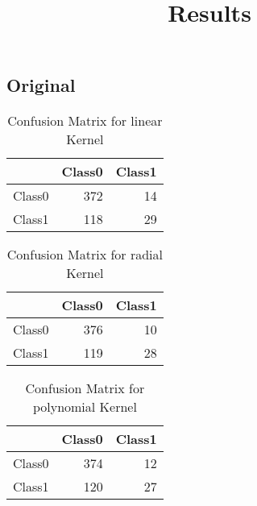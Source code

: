 

\title{Results}


\maketitle
	
\subsection{Original}

\begin{table}[H]
\centering
\begin{tabular}{rrr}
  \hline
 & Class0 & Class1 \\ 
  \hline
Class0 & 372 &  14 \\ 
  Class1 & 118 &  29 \\ 
   \hline
\end{tabular}
\caption{Confusion Matrix for linear Kernel} 
\end{table}

\begin{table}[H]
\centering
\begin{tabular}{rrr}
  \hline
 & Class0 & Class1 \\ 
  \hline
Class0 & 376 &  10 \\ 
  Class1 & 119 &  28 \\ 
   \hline
\end{tabular}
\caption{Confusion Matrix for radial Kernel} 
\end{table}

\begin{table}[H]
\centering
\begin{tabular}{rrr}
  \hline
 & Class0 & Class1 \\ 
  \hline
Class0 & 374 &  12 \\ 
  Class1 & 120 &  27 \\ 
   \hline
\end{tabular}
\caption{Confusion Matrix for polynomial Kernel} 
\end{table}

